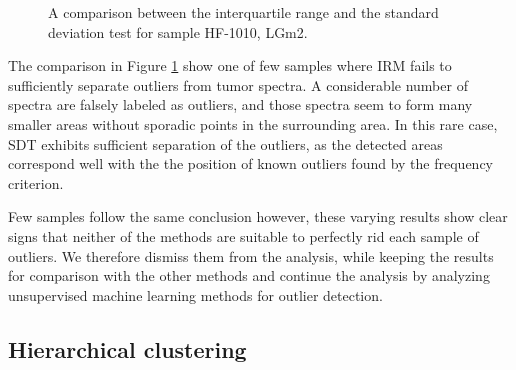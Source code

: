 \begin{figure}[h]

    \centering
    \qquad
    \caption{A comparison between the interquartile range and the standard deviation test for sample HF-1010, LGm2.
\label{fig:HF1010comp}}%
\end{figure}

The comparison in Figure \ref{fig:HF1010comp} show one of few samples where IRM fails to sufficiently separate outliers from tumor spectra. A considerable number of spectra are falsely labeled as outliers, and those spectra seem to form many smaller areas without sporadic points in the surrounding area. In this rare case, SDT exhibits sufficient separation of the outliers, as the detected areas correspond well with the the position of known outliers found by the frequency criterion.

Few samples follow the same conclusion however, these varying results show clear signs that neither of the methods are suitable to perfectly rid each sample of outliers. We therefore dismiss them from the analysis, while keeping the results for comparison with the other methods and continue the analysis by analyzing unsupervised machine learning methods for outlier detection.

\subsection{Hierarchical clustering}

